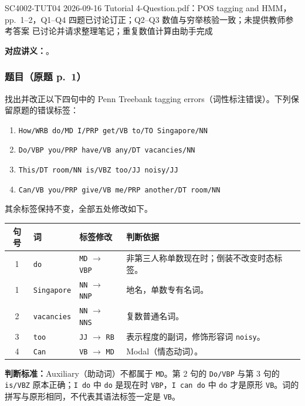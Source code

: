 
\label{tutorial:SC4002-TUT04}

\tutorialmeta
  {SC4002-TUT04}
  {2026-09-16}
  {Tutorial 4-Question.pdf：POS tagging and HMM，pp.~1--2，Q1--Q4}
  {四题已讨论订正；Q2--Q3 数值与穷举核验一致；未提供教师参考答案}
  {已讨论并请求整理笔记；重复数值计算由助手完成}


\textbf{对应讲义：}。

\subsubsection*{题目（原题 p.~1）}

找出并改正以下四句中的 Penn Treebank tagging errors（词性标注错误）。下列保留原题的错误标签：
\begin{enumerate}
  \item \texttt{How/WRB do/MD I/PRP get/VB to/TO Singapore/NN}
  \item \texttt{Do/VBP you/PRP have/VB any/DT vacancies/NN}
  \item \texttt{This/DT room/NN is/VBZ too/JJ noisy/JJ}
  \item \texttt{Can/VB you/PRP give/VB me/PRP another/DT room/NN}
\end{enumerate}

\begin{checkedsolution}
\nopagebreak[4]
其余标签保持不变，全部五处修改如下。
\begin{center}
\begin{tabularx}{\textwidth}{@{}cllX@{}}
\toprule
句号 & 词 & 标签修改 & 判断依据 \\
\midrule
1 & \texttt{do} & \texttt{MD} $\to$ \texttt{VBP} & 非第三人称单数现在时；倒装不改变时态标签。\\
1 & \texttt{Singapore} & \texttt{NN} $\to$ \texttt{NNP} & 地名，单数专有名词。\\
2 & \texttt{vacancies} & \texttt{NN} $\to$ \texttt{NNS} & 复数普通名词。\\
3 & \texttt{too} & \texttt{JJ} $\to$ \texttt{RB} & 表示程度的副词，修饰形容词 \texttt{noisy}。\\
4 & \texttt{Can} & \texttt{VB} $\to$ \texttt{MD} & Modal（情态动词）。\\
\bottomrule
\end{tabularx}
\end{center}
\textbf{判断标准：}Auxiliary（助动词）不都属于 \texttt{MD}。第 2 句的 \texttt{Do/VBP} 与第 3 句的 \texttt{is/VBZ} 原本正确；\texttt{I do} 中 \texttt{do} 是现在时 \texttt{VBP}，\texttt{I can do} 中 \texttt{do} 才是原形 \texttt{VB}。词的拼写与原形相同，不代表其语法标签一定是 \texttt{VB}。
\end{checkedsolution}

